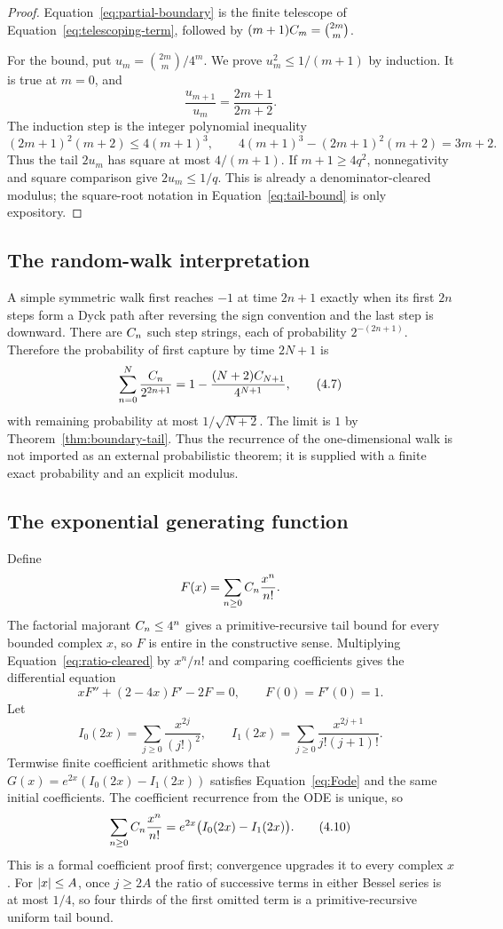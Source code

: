 \begin{proof}
Equation~\eqref{eq:partial-boundary} is the finite telescope of
Equation~\eqref{eq:telescoping-term}, followed by
$(m+1)C_m=\binom{2m}{m}$.

For the bound, put $u_m=\binom{2m}{m}/4^m$.  We prove
$u_m^2\le1/(m+1)$ by induction.  It is true at $m=0$, and
\[
 \frac{u_{m+1}}{u_m}=\frac{2m+1}{2m+2}.
\]
The induction step is the integer polynomial inequality
\[
 (2m+1)^2(m+2)\le4(m+1)^3,
 \qquad
 4(m+1)^3-(2m+1)^2(m+2)=3m+2.
\]
Thus the tail $2u_m$ has square at most $4/(m+1)$.  If
$m+1\ge4q^2$, nonnegativity and square comparison give $2u_m\le1/q$.
This is already a denominator-cleared \ipra{} modulus; the square-root notation
in Equation~\eqref{eq:tail-bound} is only expository.
\end{proof}

\subsection{The random-walk interpretation}

A simple symmetric walk first reaches $-1$ at time $2n+1$ exactly when its
first $2n$ steps form a Dyck path after reversing the sign convention and the
last step is downward.  There are $C_n$ such step strings, each of
probability $2^{-(2n+1)}$.  Therefore the probability of first capture by time
$2N+1$ is
\[
 \sum_{n=0}^{N}\frac{C_n}{2^{2n+1}}
 =1-\frac{(N+2)C_{N+1}}{4^{N+1}},                              \tag{4.7}
\]
with remaining probability at most $1/\sqrt{N+2}$.  The limit is $1$ by
Theorem~\ref{thm:boundary-tail}.  Thus the recurrence of the one-dimensional
walk is not imported as an external probabilistic theorem; it is supplied
with a finite exact probability and an explicit modulus.

\subsection{The exponential generating function}

Define
\[
 F(x)=\sum_{n\ge0}C_n\frac{x^n}{n!}.
\]
The factorial majorant $C_n\le4^n$ gives a primitive-recursive tail bound
for every bounded complex $x$, so $F$ is entire in the constructive sense.
Multiplying Equation~\eqref{eq:ratio-cleared} by $x^n/n!$ and comparing
coefficients gives the differential equation
\[
 xF''+(2-4x)F'-2F=0,
 \qquad F(0)=F'(0)=1.                                            \tag{4.8}\label{eq:Fode}
\]
Let
\[
 I_0(2x)=\sum_{j\ge0}\frac{x^{2j}}{(j!)^2},
 \qquad
 I_1(2x)=\sum_{j\ge0}\frac{x^{2j+1}}{j!(j+1)!}.                 \tag{4.9}
\]
Termwise finite coefficient arithmetic shows that
$G(x)=e^{2x}(I_0(2x)-I_1(2x))$ satisfies Equation~\eqref{eq:Fode} and the same
initial coefficients.  The coefficient recurrence from the ODE is unique,
so
\[
 \sum_{n\ge0}C_n\frac{x^n}{n!}
 =e^{2x}\bigl(I_0(2x)-I_1(2x)\bigr).                             \tag{4.10}\label{eq:egf}
\]
This is a formal coefficient proof first; convergence upgrades it to every
complex $x$.  For $\left|x\right|\le A$, once $j\ge2A$ the ratio of successive terms
in either Bessel series is at most $1/4$, so four thirds of the first omitted
term is a primitive-recursive uniform tail bound.

